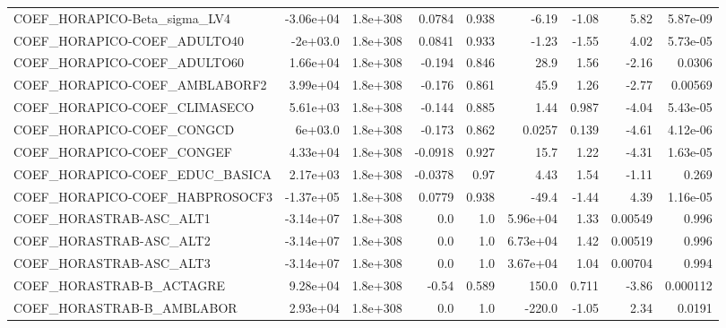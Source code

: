 \begin{tabular}{lrrrrrrrr}
COEF\_HORAPICO-Beta\_sigma\_LV4      &   -3.06e+04 &     1.8e+308 &  0.0784 &    0.938 &      -6.19 &       -1.08 &         5.82 &      5.87e-09 \\
COEF\_HORAPICO-COEF\_ADULTO40       &    -2e+03.0 &     1.8e+308 &  0.0841 &    0.933 &      -1.23 &       -1.55 &         4.02 &      5.73e-05 \\
COEF\_HORAPICO-COEF\_ADULTO60       &    1.66e+04 &     1.8e+308 &  -0.194 &    0.846 &       28.9 &        1.56 &        -2.16 &        0.0306 \\
COEF\_HORAPICO-COEF\_AMBLABORF2     &    3.99e+04 &     1.8e+308 &  -0.176 &    0.861 &       45.9 &        1.26 &        -2.77 &       0.00569 \\
COEF\_HORAPICO-COEF\_CLIMASECO      &    5.61e+03 &     1.8e+308 &  -0.144 &    0.885 &       1.44 &       0.987 &        -4.04 &      5.43e-05 \\
COEF\_HORAPICO-COEF\_CONGCD         &     6e+03.0 &     1.8e+308 &  -0.173 &    0.862 &     0.0257 &       0.139 &        -4.61 &      4.12e-06 \\
COEF\_HORAPICO-COEF\_CONGEF         &    4.33e+04 &     1.8e+308 & -0.0918 &    0.927 &       15.7 &        1.22 &        -4.31 &      1.63e-05 \\
COEF\_HORAPICO-COEF\_EDUC\_BASICA    &    2.17e+03 &     1.8e+308 & -0.0378 &     0.97 &       4.43 &        1.54 &        -1.11 &         0.269 \\
COEF\_HORAPICO-COEF\_HABPROSOCF3    &   -1.37e+05 &     1.8e+308 &  0.0779 &    0.938 &      -49.4 &       -1.44 &         4.39 &      1.16e-05 \\
COEF\_HORASTRAB-ASC\_ALT1           &   -3.14e+07 &     1.8e+308 &     0.0 &      1.0 &   5.96e+04 &        1.33 &      0.00549 &         0.996 \\
COEF\_HORASTRAB-ASC\_ALT2           &   -3.14e+07 &     1.8e+308 &     0.0 &      1.0 &   6.73e+04 &        1.42 &      0.00519 &         0.996 \\
COEF\_HORASTRAB-ASC\_ALT3           &   -3.14e+07 &     1.8e+308 &     0.0 &      1.0 &   3.67e+04 &        1.04 &      0.00704 &         0.994 \\
COEF\_HORASTRAB-B\_ACTAGRE          &    9.28e+04 &     1.8e+308 &   -0.54 &    0.589 &      150.0 &       0.711 &        -3.86 &      0.000112 \\
COEF\_HORASTRAB-B\_AMBLABOR         &    2.93e+04 &     1.8e+308 &     0.0 &      1.0 &     -220.0 &       -1.05 &         2.34 &        0.0191 \\

\end{tabular}
